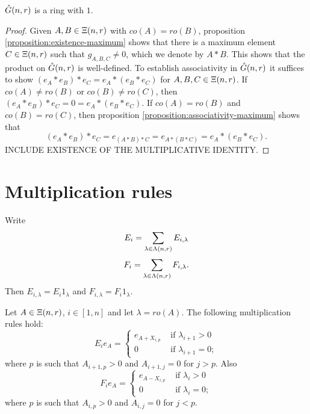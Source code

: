\documentclass[a4paper, 11pt]{report}
\begin{document}
\begin{theorem}
$\hat{G}(n,r)$ is a ring with $1$.
\end{theorem}
\begin{proof}
Given $A,B\in\Xi(n,r)$ with $co(A)=ro(B)$, proposition \ref{proposition:existence-maximum} shows that there is a maximum element $C\in\Xi(n,r)$ such that $g_{A,B,C}\neq 0$, which we denote by $A\ast B$. This shows that the product on $\hat{G}(n,r)$ is well-defined. To establish associativity in $\hat{G}(n,r)$ it suffices to show $(e_A \ast e_B)\ast e_C = e_A\ast (e_B\ast e_C)$ for $A,B,C\in\Xi(n,r)$. If $co(A)\neq ro(B)$ or $co(B)\neq ro(C)$, then $(e_A\ast e_B)\ast e_C = 0 = e_A\ast (e_B\ast e_C)$. If $co(A)=ro(B)$ and $co(B)=ro(C)$, then proposition \ref{proposition:associativity-maximum} shows that
\begin{equation*}
(e_A\ast e_B)\ast e_C = e_{(A\ast B)\ast C} = e_{A\ast (B\ast C)} = e_A\ast (e_B\ast e_C).
\end{equation*}
INCLUDE EXISTENCE OF THE MULTIPLICATIVE IDENTITY.
\end{proof}

\section{Multiplication rules}

Write
\begin{equation*}
E_i = \sum_{\lambda\in\Lambda(n,r)} E_{i,\lambda}
\end{equation*}
\begin{equation*}
F_i = \sum_{\lambda\in\Lambda(n,r)} F_{i,\lambda}.
\end{equation*}
Then $E_{i,\lambda} = E_i 1_\lambda$ and $F_{i,\lambda} = F_i 1_\lambda$.

\begin{lemma}
Let $A\in\Xi(n,r)$, $i\in [1,n]$ and let $\lambda = ro(A)$. The following multiplication rules hold:
\begin{equation*}
E_i e_A = \begin{cases}
e_{A+X_{i,p}} &\text{	if } \lambda_{i+1}>0\\
0 &\text{	if } \lambda_{i+1}=0;
\end{cases}
\end{equation*}
where $p$ is such that $A_{i+1,p}>0$ and $A_{i+1,j}=0$ for $j>p$. Also
\begin{equation*}
F_i e_A = \begin{cases}
e_{A-X_{i,p}} &\text{	if } \lambda_i>0\\
0 &\text{	if } \lambda_i=0;
\end{cases}
\end{equation*}
where $p$ is such that $A_{i,p}>0$ and $A_{i,j}=0$ for $j<p$.
\end{lemma}
\end{document}
